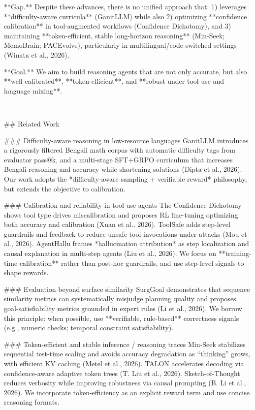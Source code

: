 **Gap.** Despite these advances, there is no unified approach that:  
1) leverages **difficulty-aware curricula** (GanitLLM) while also  
2) optimizing **confidence calibration** in tool-augmented workflows (Confidence Dichotomy), and  
3) maintaining **token-efficient, stable long-horizon reasoning** (Min-Seek; MemoBrain; PACEvolve), particularly in multilingual/code-switched settings (Winata et al., 2026).

**Goal.** We aim to build reasoning agents that are not only accurate, but also **well-calibrated**, **token-efficient**, and **robust under tool-use and language mixing**.

---

## Related Work  

### Difficulty-aware reasoning in low-resource languages  
GanitLLM introduces a rigorously filtered Bengali math corpus with automatic difficulty tags from evaluator pass@k, and a multi-stage SFT+GRPO curriculum that increases Bengali reasoning and accuracy while shortening solutions (Dipta et al., 2026). Our work adopts the *difficulty-aware sampling + verifiable reward* philosophy, but extends the objective to calibration.

### Calibration and reliability in tool-use agents  
The Confidence Dichotomy shows tool type drives miscalibration and proposes RL fine-tuning optimizing both accuracy and calibration (Xuan et al., 2026). ToolSafe adds step-level guardrails and feedback to reduce unsafe tool invocations under attacks (Mou et al., 2026). AgentHallu frames *hallucination attribution* as step localization and causal explanation in multi-step agents (Liu et al., 2026). We focus on **training-time calibration** rather than post-hoc guardrails, and use step-level signals to shape rewards.

### Evaluation beyond surface similarity  
SurgGoal demonstrates that sequence similarity metrics can systematically misjudge planning quality and proposes goal-satisfiability metrics grounded in expert rules (Li et al., 2026). We borrow this principle: when possible, use **verifiable, rule-based** correctness signals (e.g., numeric checks; temporal constraint satisfiability).

### Token-efficient and stable inference / reasoning traces  
Min-Seek stabilizes sequential test-time scaling and avoids accuracy degradation as “thinking” grows, with efficient KV caching (Metel et al., 2026). TALON accelerates decoding via confidence-aware adaptive token trees (T. Liu et al., 2026). Sketch-of-Thought reduces verbosity while improving robustness via causal prompting (B. Li et al., 2026). We incorporate token-efficiency as an explicit reward term and use concise reasoning formats.

